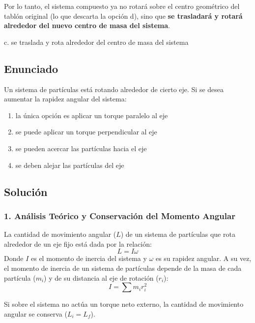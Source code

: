 \documentclass[12pt, a4paper]{article}
\begin{document}
Por lo tanto, el sistema compuesto ya no rotará sobre el centro geométrico del tablón original (lo que descarta la opción d), sino que \textbf{se trasladará y rotará alrededor del nuevo centro de masa del sistema}.

\begin{tcolorbox}[colback=green!5!white, colframe=green!50!black, title=Respuesta Correcta]
\centering \Large c. se traslada y rota alrededor del centro de masa del sistema
\end{tcolorbox}

\newpage

\subsection*{Enunciado}
Un sistema de partículas está rotando alrededor de cierto eje. Si se desea aumentar la rapidez angular del sistema:
\begin{enumerate}[label=\alph*.]
    \item la única opción es aplicar un torque paralelo al eje
    \item se puede aplicar un torque perpendicular al eje
    \item se pueden acercar las partículas hacia el eje
    \item se deben alejar las partículas del eje
\end{enumerate}

\subsection*{Solución}

\subsubsection*{1. Análisis Teórico y Conservación del Momento Angular}
La cantidad de movimiento angular ($L$) de un sistema de partículas que rota alrededor de un eje fijo está dada por la relación:
$$L = I \omega$$
Donde $I$ es el momento de inercia del sistema y $\omega$ es su rapidez angular. 
A su vez, el momento de inercia de un sistema de partículas depende de la masa de cada partícula ($m_i$) y de su distancia al eje de rotación ($r_i$):
$$I = \sum m_i r_i^2$$

Si sobre el sistema no actúa un torque neto externo, la cantidad de movimiento angular se conserva ($L_i = L_f$).
\end{document}
